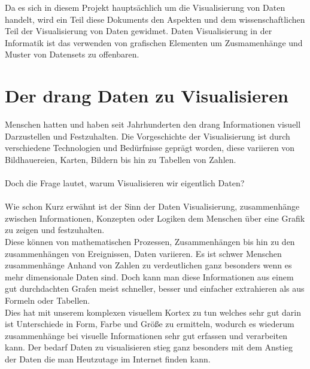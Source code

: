 
Da es sich in diesem Projekt hauptsächlich um die Visualisierung von Daten handelt, wird ein Teil diese Dokuments den Aspekten und dem
wissenschaftlichen Teil der Visualisierung von Daten gewidmet. Daten Visualisierung in der Informatik ist das verwenden von grafischen
Elementen um Zusmamenhänge und Muster von Datensets zu offenbaren.  

\section{Der drang Daten zu Visualisieren}
Menschen hatten und haben seit Jahrhunderten den drang Informationen visuell Darzustellen und Festzuhalten. Die Vorgeschichte der Visualisierung
ist durch verschiedene Technologien und Bedürfnisse geprägt worden, diese variieren von Bildhauereien, Karten, Bildern bis hin zu Tabellen
von Zahlen.\\ \\
Doch die Frage lautet, warum Visualisieren wir eigentlich Daten? \\ \\
Wie schon Kurz erwähnt ist der Sinn der Daten Visualisierung, zusammenhänge zwischen Informationen, Konzepten oder Logiken dem Menschen über
eine Grafik zu zeigen und festzuhalten.  \\
Diese können von mathematischen Prozessen, Zusammenhängen bis hin zu den zusammenhängen von Ereignissen, Daten variieren. Es ist schwer
Menschen zusammenhänge Anhand von Zahlen zu verdeutlichen ganz besonders wenn es mehr dimensionale Daten sind. Doch kann man diese
Informationen aus einem gut durchdachten Grafen meist schneller, besser und einfacher extrahieren als aus Formeln oder Tabellen. \\ 
Dies hat mit unserem komplexen visuellem Kortex zu tun welches sehr gut darin ist Unterschiede in Form, Farbe und Größe zu ermitteln, wodurch
es wiederum zusammenhänge bei visuelle Informationen sehr gut erfassen und verarbeiten kann. Der bedarf Daten zu visualisieren stieg ganz
besonders mit dem Anstieg der Daten die man Heutzutage im Internet finden kann. \newpage

